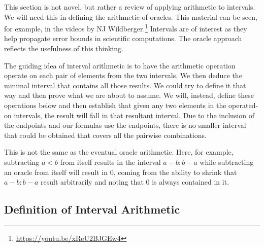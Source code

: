 \documentclass[12pt]{article}
\begin{document}
This section is not novel, but rather a review of applying arithmetic to intervals. We will need this in defining the arithmetic of oracles. This material can be seen, for example, in the videos by NJ Wildberger.\footnote{\url{https://youtu.be/xReU2BJGEw4}} Intervals are of interest as they help propagate error bounds in scientific computations. The oracle approach reflects the usefulness of this thinking. 

The guiding idea of interval arithmetic is to have the arithmetic operation operate on each pair of elements from the two intervals. We then deduce the minimal interval that contains all those results. We could try to define it that way and then prove what we are about to assume. We will, instead, define these operations below and then establish that given any two elements in the operated-on intervals, the result will fall in that resultant interval. Due to the inclusion of the endpoints and our formulas use the endpoints, there is no smaller interval that could be obtained that covers all the pairwise combinations. 

This is not the same as the eventual oracle arithmetic. Here, for example, subtracting $a<b$ from itself results in the interval $a-b:b-a$ while subtracting an oracle from itself will result in $0$, coming from the ability to shrink that $a-b:b-a$ result arbitrarily and noting that $0$ is always contained in it. 

\subsection{Definition of Interval Arithmetic}
\end{document}
